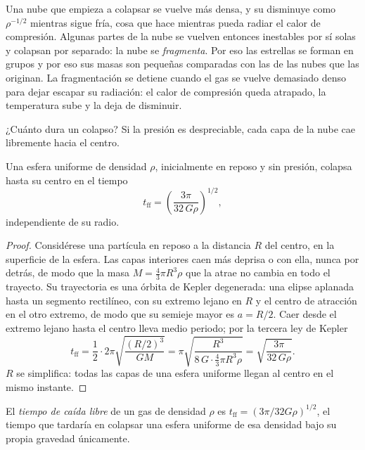 Una nube que empieza a colapsar se vuelve más densa, y su  disminuye como
$\rho^{-1/2}$ mientras sigue fría, cosa que hace mientras pueda radiar el
calor de compresión. Algunas partes de la nube se vuelven entonces inestables por sí solas
y colapsan por separado: la nube se \emph{fragmenta}. Por eso las estrellas se forman
en grupos y por eso sus masas son pequeñas comparadas con las de las nubes que las
originan. La fragmentación se detiene cuando el gas se vuelve demasiado denso para dejar escapar
su radiación: el calor de compresión queda atrapado, la temperatura sube y la
 deja de disminuir.

¿Cuánto dura un colapso? Si la presión es despreciable, cada capa de la
nube cae libremente hacia el centro.

\begin{proposition}\label{prop:b2:ism-star-formation:free-fall}
Una esfera uniforme de densidad $\rho$, inicialmente en reposo y sin presión,
colapsa hasta su centro en el tiempo
\[
  t_{\mathrm{ff}} = \left(\frac{3\pi}{32\,G\rho}\right)^{1/2},
\]
independiente de su radio.
\end{proposition}

\begin{proof}
Considérese una partícula en reposo a la distancia $R$ del centro, en la
superficie de la esfera. Las capas interiores caen más deprisa o con ella, nunca
por detrás, de modo que la masa $M = \tfrac43\pi R^3\rho$ que la atrae no cambia en
todo el trayecto. Su trayectoria es una órbita de Kepler degenerada: una elipse aplanada hasta
un segmento rectilíneo, con su extremo lejano en $R$ y el centro de atracción en
el otro extremo, de modo que su semieje mayor es $a = R/2$. Caer desde el extremo lejano
hasta el centro lleva medio periodo; por la tercera ley de Kepler
\[
  t_{\mathrm{ff}} = \frac12\cdot 2\pi\sqrt{\frac{(R/2)^3}{GM}}
  = \pi\sqrt{\frac{R^3}{8\,G\cdot\frac43\pi R^3\rho}}
  = \sqrt{\frac{3\pi}{32\,G\rho}} .
\]
$R$ se simplifica: todas las capas de una esfera uniforme llegan al centro en el mismo
instante.
\end{proof}

\begin{definition}\label{def:b2:ism-star-formation:free-fall}
El \emph{tiempo de caída libre} de un gas de densidad $\rho$ es
$t_{\mathrm{ff}} = (3\pi/32G\rho)^{1/2}$, el tiempo que tardaría en colapsar una esfera uniforme de esa
densidad bajo su propia gravedad únicamente.
\end{definition}

